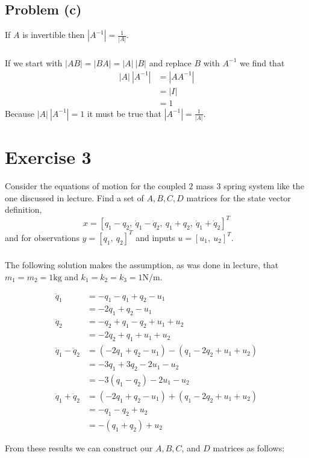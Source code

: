 \documentclass[11pt]{article}
\begin{document}
\subsection*{Problem (c)}
If $A$ is invertible then $|A^{-1}| = \frac{1}{|A|}$.
\subparagraph*{}
If we start with $|AB| = |BA| = |A|\ |B|$ and replace $B$ with $A^{-1}$ we find that 
\begin{align*}
	|A|\ |A^{-1}| &= |AA^{-1}| \\
	&= |I| \\
	&= 1
\end{align*}
Because $|A|\ |A^{-1}| = 1$ it must be true that $|A^{-1}| = \frac{1}{|A|}$. 

\section*{Exercise 3}
Consider the equations of motion for the coupled $2$ mass $3$ spring system like the one discussed in lecture. Find a set of $A,B,C,D$ matrices for the state vector definition,
\begin{equation*}
	x = [q_1-q_2,\ \dot{q}_1-\dot{q}_2,\ q_1+q_2,\ \dot{q}_1+\dot{q}_2]^T 
\end{equation*}
and for observations $y=[q_1,\ q_2]^T$ and inputs $u=[u_1,\ u_2]^T$.

\subparagraph{}
The following solution makes the assumption, as was done in lecture, that $m_1 = m_2 = 1\text{kg}$ and $k_1 = k_2 = k_3 = 1\text{N/m}$.

\begin{align*}
	\ddot{q}_1 &= -q_1 - q_1 + q_2 - u_1 \\
	&= -2q_1 + q_2 - u_1 \\
	\ddot{q}_2 &= -q_2 + q_1 - q_2 + u_1 + u_2 \\
	&= -2q_2 + q_1 + u_1 + u_2 \\
	\ddot{q}_1-\ddot{q}_2 &= (-2q_1+q_2-u_1) - (q_1-2q_2+u_1+u_2) \\
	&= -3q_1 + 3q_2 - 2u_1 - u_2 \\
	&= -3(q_1 - q_2) -2u_1 - u_2 \\
	\ddot{q}_1+\ddot{q}_2 &= (-2q_1+q_2-u_1) + (q_1-2q_2+u_1+u_2) \\
	&= -q_1 - q_2 + u_2 \\
	&= -(q_1 + q_2) + u_2 
\end{align*}

From these results we can construct our $A,B,C$, and $D$ matrices as follows:
\end{document}

